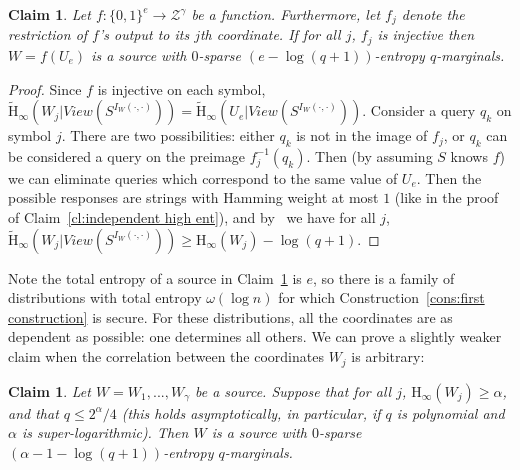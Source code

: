 \documentclass[11pt]{article}
\newtheorem{claim}[theorem]{Claim}
\newcommand{\clref}[1]{\mbox{Claim~\ref{#1}}}
\newcommand{\consref}[1]{\mbox{Construction~\ref{#1}}}
\newcommand{\zo}{\ensuremath{\{0, 1\}}}
\newcommand{\Hoo}{\mathrm{H}_\infty}
\newcommand{\Hav}{\tilde{\mathrm{H}}_\infty}
\begin{document}
\begin{claim}
\label{cl:each block from single seed}
Let $f:\zo^e \rightarrow \mathcal{Z}^\gamma$ be a function.  Furthermore, let $f_j$ denote the restriction of $f$'s output to its $j$th coordinate.  If for all $j$, $f_j$ is injective then $W = f(U_e)$ is a source with  $0$-sparse $(e - \log (q+1))$-entropy $q$-marginals.
\end{claim}
\begin{proof}
Since $f$ is injective on each symbol, $\Hav(W_j | View(S^{I_{W}(\cdot, \cdot)})) = \Hav(U_e | View(S^{I_{W}(\cdot, \cdot)}))$.  Consider a query $q_k$ on symbol $j$.  There are two possibilities: either $q_k$ is not in the image of $f_j$,  or $q_k$ can be considered a query on the preimage $f_j^{-1}(q_k)$. Then (by assuming $S$ knows $f$) we can eliminate queries which correspond to the same value of $U_e$.  Then the possible responses are strings with Hamming weight at most $1$ (like in the
proof of \clref{cl:independent high ent}),
 and by~\cite[Lemma 2.2]{DBLP:journals/siamcomp/DodisORS08} we have for all $j$, $\Hav(W_j | View(S^{I_{W}(\cdot, \cdot)})) \geq \Hoo(W_j) -\log (q+1)$.
\end{proof}

Note the total entropy of a source in \clref{cl:each block from single seed} is $e$, so there is a family of distributions with total entropy $\omega(\log n)$ for which \consref{cons:first construction} is secure.  For these distributions, all the coordinates are as dependent as possible: one determines all others.
We can prove a slightly weaker claim when the correlation between the coordinates $W_j$ is arbitrary:

\begin{claim}
\label{cl:all blocks entropy}
Let $W = W_1,..., W_\gamma$ be a source.  Suppose that for all $j$, $\Hoo(W_j)\geq \alpha$, and that $q \le 2^{\alpha}/4$ (this holds asymptotically, in particular, if $q$ is polynomial and $\alpha$ is super-logarithmic). Then  $W$ is a source with $0$-sparse $(\alpha-1-\log(q+1))$-entropy $q$-marginals.
\end{claim}
\end{document}
